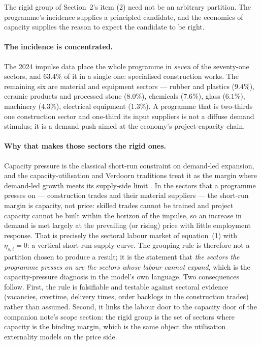 \documentclass[11pt]{article}
\begin{document}
The rigid group of Section~2's item (2) need not be an arbitrary partition. The
programme's incidence supplies a principled candidate, and the economics of
capacity supplies the reason to expect the candidate to be right.

\paragraph{The incidence is concentrated.} The 2024 impulse data place the whole
programme in \emph{seven} of the seventy-one sectors, and $63.4\%$ of it in a
single one: specialised construction works. The remaining six are material and
equipment sectors --- rubber and plastics ($9.4\%$), ceramic products and
processed stone ($8.0\%$), chemicals ($7.6\%$), glass ($6.1\%$), machinery
($4.3\%$), electrical equipment ($1.3\%$). A programme that is two-thirds one
construction sector and one-third its input suppliers is not a diffuse demand
stimulus; it is a demand push aimed at the economy's project-capacity chain.

\paragraph{Why that makes those sectors the rigid ones.} Capacity pressure is
the classical short-run constraint on demand-led expansion, and the
capacity-utilisation and Verdoorn traditions treat it as the margin where
demand-led growth meets its supply-side limit
\cite{verdoorn1949,kaldor1966,lavoie2014}. In the sectors that a programme
presses on --- construction trades and their material suppliers --- the
short-run margin is capacity, not price: skilled trades cannot be trained and
project capacity cannot be built within the horizon of the impulse, so an
increase in demand is met largely at the prevailing (or rising) price with
little employment response. That is precisely the sectoral labour market of
equation~(1) with $\eta_{s,i} = 0$: a vertical short-run supply curve. The
grouping rule is therefore not a partition chosen to produce a result; it is the
statement that \emph{the sectors the programme presses on are the sectors whose
labour cannot expand}, which is the capacity-pressure diagnosis in the model's
own language. Two consequences follow. First, the rule is falsifiable and
testable against sectoral evidence (vacancies, overtime, delivery times, order
backlogs in the construction trades) rather than assumed. Second, it links the
labour door to the capacity door of the companion note's scope section: the
rigid group is the set of sectors where capacity is the binding margin, which is
the same object the utilisation externality models on the price side.
\end{document}
